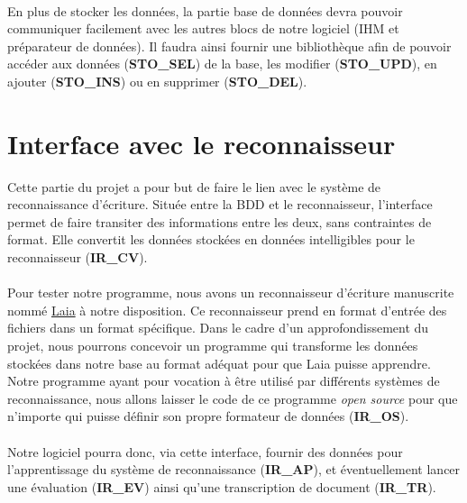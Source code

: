 \paragraph{}
En plus de stocker les données, la partie base de données devra pouvoir
communiquer facilement avec les autres blocs de notre logiciel (IHM et
préparateur de données). Il faudra ainsi fournir une bibliothèque afin 
de pouvoir accéder aux données (\textbf{STO\_SEL}) de la base, les modifier
(\textbf{STO\_UPD}), en ajouter (\textbf{STO\_INS}) ou en supprimer
(\textbf{STO\_DEL}).

\section{Interface avec le reconnaisseur}

Cette partie du projet a pour but de faire le lien avec le système de
reconnaissance d’écriture. Située entre la BDD et le reconnaisseur,
l’interface permet de faire transiter des informations entre les deux, sans
contraintes de format. Elle convertit les données stockées en données
intelligibles pour le reconnaisseur (\textbf{IR\_CV}).

\paragraph{}
Pour tester notre programme, nous avons un reconnaisseur d’écriture
manuscrite nommé
\href{https://github.com/jpuigcerver/Laia/tree/master/egs/iam}{Laia} à notre
disposition. Ce reconnaisseur prend en format d’entrée des fichiers dans un
format spécifique. Dans le cadre d'un approfondissement du projet, nous
pourrons concevoir un programme qui transforme les
données stockées dans notre base au format adéquat pour que Laia puisse
apprendre. Notre programme ayant pour vocation à être utilisé par différents
systèmes de reconnaissance, nous allons laisser le code de ce programme
\textit{open source} pour que n’importe qui puisse définir son propre
formateur de données (\textbf{IR\_OS}).

\paragraph{}
Notre logiciel pourra donc, via cette interface, fournir des données pour 
l’apprentissage du système de reconnaissance (\textbf{IR\_AP}), et éventuellement lancer une
évaluation (\textbf{IR\_EV}) ainsi qu'une transcription de document
(\textbf{IR\_TR}).
